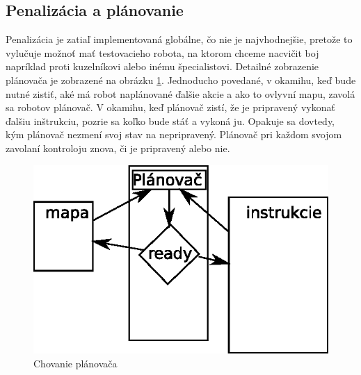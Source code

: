 \subsection{Penalizácia a plánovanie}
Penalizácia je zatiaľ implementovaná globálne, čo nie je najvhodnejšie, pretože to vylučuje možnoť mať testovacieho robota, na ktorom chceme nacvičit boj napríklad proti kuzelníkovi alebo inému špecialistovi. Detailné zobrazenie plánovača je zobrazené na obrázku \ref{fig:sch}. Jednoducho povedané, v okamihu, keď bude nutné zistiť, aké má robot naplánované ďalšie akcie a ako to ovlyvní mapu, zavolá sa robotov plánovač. V okamihu, keď plánovač zistí, že je pripravený vykonať ďalšiu inštrukciu, pozrie sa koľko bude stáť a vykoná ju. Opakuje sa dovtedy, kým plánovač nezmení svoj stav na nepripravený.  Plánovač pri každom svojom zavolaní kontroloju znova, či je pripravený alebo nie.\\
\begin{figure}
\centering
\includegraphics{planovac}
\caption{Chovanie plánovača}
\label{fig:sch}
\end{figure}

